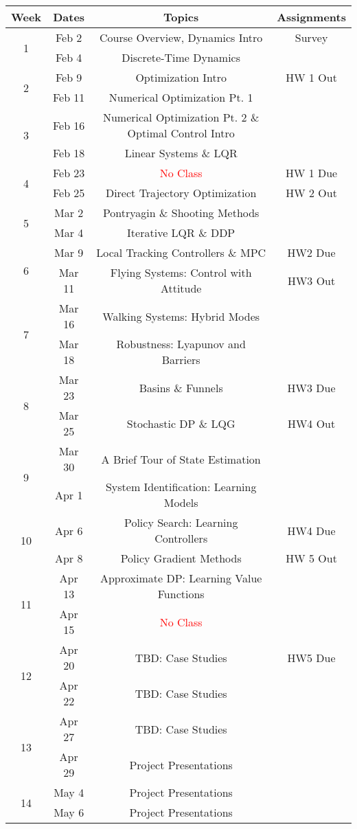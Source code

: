 \documentclass[11pt,letterpaper]{article}
\begin{document}
\begin{tabular}{c|c|c|c}
	Week & Dates & Topics & Assignments \\
	\hline
	\multirow{2}{*}{1} & Feb 2 & Course Overview, Dynamics Intro & Survey \\
	 & Feb 4 & Discrete-Time Dynamics &  \\
	\hline
	\multirow{2}{*}{2} & Feb 9 & Optimization Intro & HW 1 Out \\
	 & Feb 11 & Numerical Optimization Pt. 1 &  \\
	\hline
	\multirow{2}{*}{3}  & Feb 16 & Numerical Optimization Pt. 2 \& Optimal Control Intro &  \\
	 & Feb 18 & Linear Systems \& LQR &  \\
	\hline
	\multirow{2}{*}{4}  & Feb 23 & \textcolor{red}{No Class} & HW 1 Due \\
	 & Feb 25 & Direct Trajectory Optimization & HW 2 Out \\
	\hline
	\multirow{2}{*}{5}  & Mar 2 & Pontryagin \& Shooting Methods & \\
	 & Mar 4 & Iterative LQR \& DDP &  \\
	\hline
	\multirow{2}{*}{6}  & Mar 9 & Local Tracking Controllers \& MPC &   HW2 Due \\
	 & Mar 11 & Flying Systems: Control with Attitude & HW3 Out \\
	\hline
	\multirow{2}{*}{7}  & Mar 16 & Walking Systems: Hybrid Modes  & \\
	 & Mar 18 & Robustness: Lyapunov and Barriers & \\
	\hline
	\multirow{2}{*}{8}  & Mar 23 & Basins \& Funnels & HW3 Due\\
	 & Mar 25 & Stochastic DP \& LQG & HW4 Out  \\
	\hline
	\multirow{2}{*}{9}  & Mar 30 & A Brief Tour of State Estimation &  \\
	 & Apr 1 & System Identification: Learning Models &   \\
	\hline
	\multirow{2}{*}{10}  & Apr 6 & Policy Search: Learning Controllers &  HW4 Due \\
	 & Apr 8 & Policy Gradient Methods &  HW 5 Out \\
	 \hline
	\multirow{2}{*}{11}  & Apr 13 & Approximate DP: Learning Value Functions &  \\
	 & Apr 15 & \textcolor{red}{No Class} &   \\
	 \hline
	\multirow{2}{*}{12}  & Apr 20 & TBD: Case Studies &  HW5 Due \\
	 & Apr 22 & TBD: Case Studies &   \\
	 \hline
	\multirow{2}{*}{13}  & Apr 27 & TBD: Case Studies &  \\
	 & Apr 29 & Project Presentations &   \\
	 \hline
	\multirow{2}{*}{14}  & May 4 & Project Presentations &  \\
	 & May 6 & Project Presentations &   \\
\end{tabular}
\end{document}
